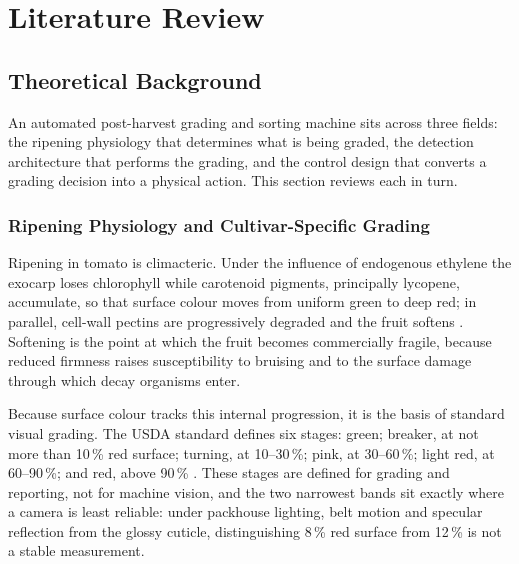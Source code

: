\section{Literature Review}
\label{ch:literature}

\subsection{Theoretical Background}
\label{sec:theory}

An automated post-harvest grading and sorting machine sits across three fields: the ripening physiology that determines what is being graded, the detection architecture that performs the grading, and the control design that converts a grading decision into a physical action. This section reviews each in turn.

\subsubsection{Ripening Physiology and Cultivar-Specific Grading}
\label{sec:ripening}

Ripening in tomato is climacteric. Under the influence of endogenous ethylene the exocarp loses chlorophyll while carotenoid pigments, principally lycopene, accumulate, so that surface colour moves from uniform green to deep red; in parallel, cell-wall pectins are progressively degraded and the fruit softens \citep{abekoon2024}. Softening is the point at which the fruit becomes commercially fragile, because reduced firmness raises susceptibility to bruising and to the surface damage through which decay organisms enter.

Because surface colour tracks this internal progression, it is the basis of standard visual grading. The \acrfull{USDA} standard defines six stages: green; breaker, at not more than 10\,\% red surface; turning, at 10--30\,\%; pink, at 30--60\,\%; light red, at 60--90\,\%; and red, above 90\,\% \citep{usda1991}. These stages are defined for grading and reporting, not for machine vision, and the two narrowest bands sit exactly where a camera is least reliable: under packhouse lighting, belt motion and specular reflection from the glossy cuticle, distinguishing 8\,\% red surface from 12\,\% is not a stable measurement.

